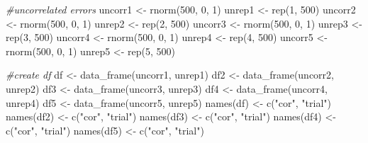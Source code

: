\documentclass[
]{article}
\newenvironment{Shaded}{\begin{snugshade}}{\end{snugshade}}
\newcommand{\CommentTok}[1]{\textcolor[rgb]{0.56,0.35,0.01}{\textit{#1}}}
\newcommand{\DecValTok}[1]{\textcolor[rgb]{0.00,0.00,0.81}{#1}}
\newcommand{\FunctionTok}[1]{\textcolor[rgb]{0.00,0.00,0.00}{#1}}
\newcommand{\NormalTok}[1]{#1}
\newcommand{\OtherTok}[1]{\textcolor[rgb]{0.56,0.35,0.01}{#1}}
\newcommand{\StringTok}[1]{\textcolor[rgb]{0.31,0.60,0.02}{#1}}
\begin{document}
\begin{Shaded}
\begin{Highlighting}[]
\CommentTok{\#uncorrelated errors}
\NormalTok{uncorr1 }\OtherTok{\textless{}{-}} \FunctionTok{rnorm}\NormalTok{(}\DecValTok{500}\NormalTok{, }\DecValTok{0}\NormalTok{, }\DecValTok{1}\NormalTok{)}
\NormalTok{unrep1 }\OtherTok{\textless{}{-}} \FunctionTok{rep}\NormalTok{(}\DecValTok{1}\NormalTok{, }\DecValTok{500}\NormalTok{)}
\NormalTok{uncorr2 }\OtherTok{\textless{}{-}} \FunctionTok{rnorm}\NormalTok{(}\DecValTok{500}\NormalTok{, }\DecValTok{0}\NormalTok{, }\DecValTok{1}\NormalTok{)}
\NormalTok{unrep2 }\OtherTok{\textless{}{-}} \FunctionTok{rep}\NormalTok{(}\DecValTok{2}\NormalTok{, }\DecValTok{500}\NormalTok{)}
\NormalTok{uncorr3 }\OtherTok{\textless{}{-}} \FunctionTok{rnorm}\NormalTok{(}\DecValTok{500}\NormalTok{, }\DecValTok{0}\NormalTok{, }\DecValTok{1}\NormalTok{)}
\NormalTok{unrep3 }\OtherTok{\textless{}{-}} \FunctionTok{rep}\NormalTok{(}\DecValTok{3}\NormalTok{, }\DecValTok{500}\NormalTok{)}
\NormalTok{uncorr4 }\OtherTok{\textless{}{-}} \FunctionTok{rnorm}\NormalTok{(}\DecValTok{500}\NormalTok{, }\DecValTok{0}\NormalTok{, }\DecValTok{1}\NormalTok{)}
\NormalTok{unrep4 }\OtherTok{\textless{}{-}} \FunctionTok{rep}\NormalTok{(}\DecValTok{4}\NormalTok{, }\DecValTok{500}\NormalTok{)}
\NormalTok{uncorr5 }\OtherTok{\textless{}{-}} \FunctionTok{rnorm}\NormalTok{(}\DecValTok{500}\NormalTok{, }\DecValTok{0}\NormalTok{, }\DecValTok{1}\NormalTok{)}
\NormalTok{unrep5 }\OtherTok{\textless{}{-}} \FunctionTok{rep}\NormalTok{(}\DecValTok{5}\NormalTok{, }\DecValTok{500}\NormalTok{)}

\CommentTok{\#create df}
\NormalTok{df }\OtherTok{\textless{}{-}} \FunctionTok{data\_frame}\NormalTok{(uncorr1, unrep1)}
\NormalTok{df2 }\OtherTok{\textless{}{-}} \FunctionTok{data\_frame}\NormalTok{(uncorr2, unrep2)}
\NormalTok{df3 }\OtherTok{\textless{}{-}} \FunctionTok{data\_frame}\NormalTok{(uncorr3, unrep3)}
\NormalTok{df4 }\OtherTok{\textless{}{-}} \FunctionTok{data\_frame}\NormalTok{(uncorr4, unrep4)}
\NormalTok{df5 }\OtherTok{\textless{}{-}} \FunctionTok{data\_frame}\NormalTok{(uncorr5, unrep5)}
\FunctionTok{names}\NormalTok{(df) }\OtherTok{\textless{}{-}} \FunctionTok{c}\NormalTok{(}\StringTok{"cor"}\NormalTok{, }\StringTok{"trial"}\NormalTok{)}
\FunctionTok{names}\NormalTok{(df2) }\OtherTok{\textless{}{-}} \FunctionTok{c}\NormalTok{(}\StringTok{"cor"}\NormalTok{, }\StringTok{"trial"}\NormalTok{)}
\FunctionTok{names}\NormalTok{(df3) }\OtherTok{\textless{}{-}} \FunctionTok{c}\NormalTok{(}\StringTok{"cor"}\NormalTok{, }\StringTok{"trial"}\NormalTok{)}
\FunctionTok{names}\NormalTok{(df4) }\OtherTok{\textless{}{-}} \FunctionTok{c}\NormalTok{(}\StringTok{"cor"}\NormalTok{, }\StringTok{"trial"}\NormalTok{)}
\FunctionTok{names}\NormalTok{(df5) }\OtherTok{\textless{}{-}} \FunctionTok{c}\NormalTok{(}\StringTok{"cor"}\NormalTok{, }\StringTok{"trial"}\NormalTok{)}


\end{Highlighting}
\end{Shaded}
\end{document}
